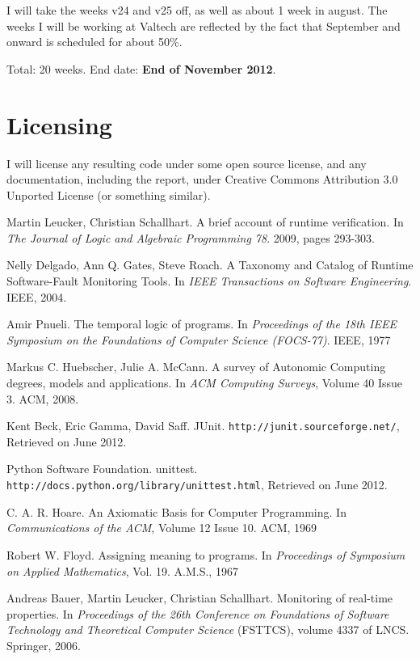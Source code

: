 \documentclass[a4paper,11pt]{article}
\begin{document}
I will take the weeks v24 and v25 off, as well as about 1 week in august.
The weeks I will be working at Valtech are reflected by the fact that September and onward
is scheduled for about 50\%.

Total: 20 weeks. End date: \textbf{End of November 2012}.


\section{Licensing}

I will license any resulting code under some open source license, and any documentation, including the report, under Creative Commons Attribution 3.0 Unported License \cite{cc-by} (or something similar).


\begin{thebibliography}{99}

	Martin Leucker, Christian Schallhart.
	A brief account of runtime verification.
	In \emph{The Journal of Logic and Algebraic Programming 78}.
	2009, pages 293-303.

	Nelly Delgado, Ann Q. Gates, Steve Roach.
	A Taxonomy and Catalog of Runtime Software-Fault Monitoring Tools.
	In \emph{IEEE Transactions on Software Engineering}.
	IEEE, 2004.

	Amir Pnueli.
	The temporal logic of programs. 
	In \emph{Proceedings of the 18th IEEE Symposium on the Foundations of Computer Science (FOCS-77)}.
	IEEE, 1977

	Markus C. Huebscher, Julie A. McCann.
	A survey of Autonomic Computing \- degrees, models and applications.
	In \emph{ACM Computing Surveys}, Volume 40 Issue 3.
	ACM, 2008.
	
	Kent Beck, Eric Gamma, David Saff.
	JUnit.
	\texttt{http://junit.sourceforge.net/},
	Retrieved on June 2012.

	Python Software Foundation.
	unittest.
	\texttt{http://docs.python.org/library/unittest.html},
	Retrieved on June 2012.

	C. A. R. Hoare.
	An Axiomatic Basis for Computer Programming.
	In \emph{Communications of the ACM}, Volume 12 Issue 10.
	ACM, 1969

	Robert W. Floyd.
	Assigning meaning to programs.
	In \emph{Proceedings of Symposium on Applied Mathematics}, Vol. 19.
	A.M.S., 1967

	Andreas Bauer, Martin Leucker, Christian Schallhart.
	Monitoring of real-time properties.
	In \emph{Proceedings of the 26th Conference on Foundations of Software Technology and Theoretical Computer Science} (FSTTCS), volume 4337 of LNCS.
	Springer, 2006.


\end{thebibliography}
\end{document}
